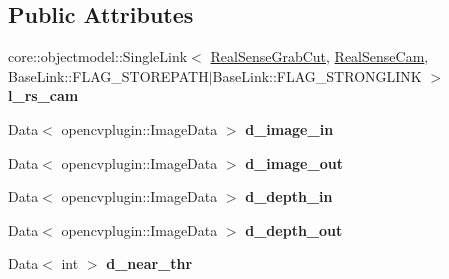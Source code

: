 \subsection*{Public Attributes}
\begin{DoxyCompactItemize}
\item 
\mbox{\label{classsofa_1_1rgbdtracking_1_1_real_sense_grab_cut_a761ad9c4afbcf2296b04a4431a294616}} 
core\+::objectmodel\+::\+Single\+Link$<$ \hyperlink{classsofa_1_1rgbdtracking_1_1_real_sense_grab_cut}{Real\+Sense\+Grab\+Cut}, \hyperlink{classsofa_1_1rgbdtracking_1_1_real_sense_cam}{Real\+Sense\+Cam}, Base\+Link\+::\+F\+L\+A\+G\+\_\+\+S\+T\+O\+R\+E\+P\+A\+TH$\vert$Base\+Link\+::\+F\+L\+A\+G\+\_\+\+S\+T\+R\+O\+N\+G\+L\+I\+NK $>$ {\bfseries l\+\_\+rs\+\_\+cam}
\item 
\mbox{\label{classsofa_1_1rgbdtracking_1_1_real_sense_grab_cut_a01f768822f64914b92234b03bd5c9d6f}} 
Data$<$ opencvplugin\+::\+Image\+Data $>$ {\bfseries d\+\_\+image\+\_\+in}
\item 
\mbox{\label{classsofa_1_1rgbdtracking_1_1_real_sense_grab_cut_a2b2daf39abe1d4acf77316a41ada7ac8}} 
Data$<$ opencvplugin\+::\+Image\+Data $>$ {\bfseries d\+\_\+image\+\_\+out}
\item 
\mbox{\label{classsofa_1_1rgbdtracking_1_1_real_sense_grab_cut_adeb52bee3090e991650f8a49b4bec7bd}} 
Data$<$ opencvplugin\+::\+Image\+Data $>$ {\bfseries d\+\_\+depth\+\_\+in}
\item 
\mbox{\label{classsofa_1_1rgbdtracking_1_1_real_sense_grab_cut_a368ca4797dd54ff927e75d9cfc561787}} 
Data$<$ opencvplugin\+::\+Image\+Data $>$ {\bfseries d\+\_\+depth\+\_\+out}
\item 
\mbox{\label{classsofa_1_1rgbdtracking_1_1_real_sense_grab_cut_af51a13c31b7b6a22f9e8e5b6f276870a}} 
Data$<$ int $>$ {\bfseries d\+\_\+near\+\_\+thr}
\item 
\mbox{\label{classsofa_1_1rgbdtracking_1_1_real_sense_grab_cut_a8150b5cacf4c223b35a98bb6c78b3b5b}} 

\end{DoxyCompactItemize}
